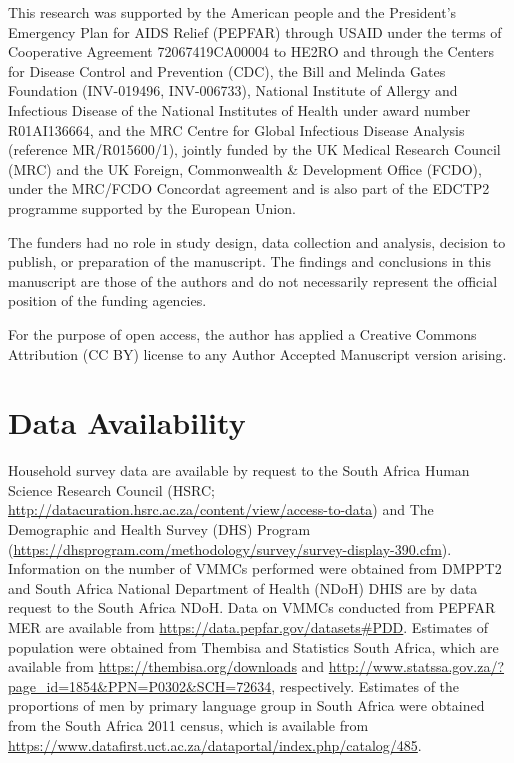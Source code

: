\documentclass{article}
\begin{document}
This research was supported by the American people and the President's Emergency Plan for AIDS Relief (PEPFAR) through USAID under the terms of Cooperative Agreement 72067419CA00004 to HE2RO and through the Centers for Disease Control and Prevention (CDC), the Bill and Melinda Gates Foundation (INV-019496, INV-006733), National Institute of Allergy and Infectious Disease of the National Institutes of Health under award number R01AI136664, and the MRC Centre for Global Infectious Disease Analysis (reference MR/R015600/1), jointly funded by the UK Medical Research Council (MRC) and the UK Foreign, Commonwealth \& Development Office (FCDO), under the MRC/FCDO Concordat agreement and is also part of the EDCTP2 programme supported by the European Union.

The funders had no role in study design, data collection and analysis, decision to publish, or preparation of the manuscript. The findings and conclusions in this manuscript are those of the authors and do not necessarily represent the official position of the funding agencies.

For the purpose of open access, the author has applied a Creative Commons Attribution (CC BY) license to any Author Accepted Manuscript version arising.


\section*{Data Availability}


Household survey data are available by request to the South Africa Human Science Research Council (HSRC; \url{http://datacuration.hsrc.ac.za/content/view/access-to-data}) and The Demographic and Health Survey (DHS) Program (\url{https://dhsprogram.com/methodology/survey/survey-display-390.cfm}). Information on the number of VMMCs performed were obtained from DMPPT2 and South Africa National Department of Health (NDoH) DHIS are by data request to the South Africa NDoH. Data on VMMCs conducted from PEPFAR MER are available from \url{https://data.pepfar.gov/datasets#PDD}. Estimates of population were obtained from Thembisa and Statistics South Africa, which are available from \url{https://thembisa.org/downloads} and \url{http://www.statssa.gov.za/?page_id=1854&PPN=P0302&SCH=72634}, respectively. Estimates of the proportions of men by primary language group in South Africa were obtained from the South Africa 2011 census, which is available from \url{https://www.datafirst.uct.ac.za/dataportal/index.php/catalog/485}.
\end{document}
